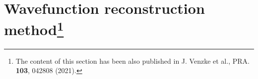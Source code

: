 \section[Wavefunction reconstruction method]{Wavefunction reconstruction method\protect\footnote{The content of this section has been also published in J. Venzke et al., PRA. \textbf{103}, 042808 (2021).}} %
\label{sec:wavefunction_reconstruction}

